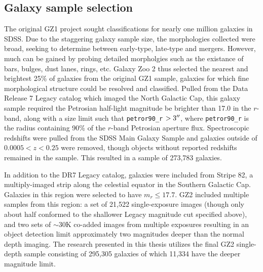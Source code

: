 \subsection{Galaxy sample selection}

The original GZ1 project sought classifications for nearly one million galaxies in SDSS. Due to the staggering galaxy sample size, the morphologies collected were broad, seeking to determine between early-type, late-type and mergers. However, much can be gained by probing detailed morpholgies such as the existance of bars, bulges, dust lanes, rings, etc. Galaxy Zoo 2 thus selected the nearest and brightest 25\% of galaxies from the original GZ1 sample, galaxies for which fine morphological structure could be resolved and classified. Pulled from the Data Release 7 Legacy catalog \citep{Abazajian2009} which imaged the North Galactic Cap, this galaxy sample required the Petrosian half-light magnitude be brighter than 17.0 in the $r$-band, along with a size limit such that \texttt{petror90\_r} $>3\mbox{$^{\prime\prime}$}$, where \texttt{petror90\_r} is the radius containing 90\% of the $r$-band Petrosian aperture flux. Spectroscopic redshifts were pulled from the SDSS Main Galaxy Sample \citep{Strauss2002} and galaxies outside of $0.0005 < z < 0.25$ were removed, though objects without reported redshifts remained in the sample. This resulted in a sample of 273,783 galaxies. 

In addition to the DR7 Legacy catalog, galaxies were included from Stripe 82, a multiply-imaged strip along the celestial equator in the Southern Galactic Cap. Galaxies in this region were selected to have $m_r\le17.7$. GZ2 included multiple samples from this region: a set of 21,522 single-exposure images (though only about half conformed to the shallower Legacy magnitude cut specified above), and two sets of $\sim$30K co-added images from multiple exposures resulting in an object detection limit approximately two magnitudes deeper than the normal depth imaging. The research presented in this thesis utilizes the final GZ2 single-depth sample consisting of 295,305 galaxies of which 11,334 have the deeper magnitude limit. 


